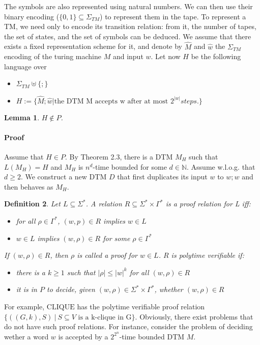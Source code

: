 \documentclass{report}
\newtheorem{definition}{Definition}[chapter]
\newtheorem{lemma}[definition]{Lemma}
\begin{document}
The symbols are also represented using natural numbers. We can then use their binary encoding ($\{0,1\}\subseteq\Sigma_{TM}$) to represent them in the tape. To represent a TM, we need only to encode its transition relation: from it, the number of tapes, the set of states, and the set of symbols can be deduced. We assume that there exists a fixed representation scheme for it, and denote by $\hat{M}$ and $\hat{w}$ the $\Sigma_{TM}$ encoding of the turing machine $M$ and input $w$. Let now $H$ be the following language over
\begin{itemize}
\item[] $\Sigma_{TM} \uplus \{;\}$
\item[] $H := \{ \hat{M};\hat{w} | \text{the DTM M accepts w after at most }2^{|w|} steps.\}$
\end{itemize}

\begin{lemma}
$H \not\in P$.
\end{lemma}

\paragraph{Proof} Assume that  $H \in P$. By Theorem 2.3, there is a DTM $M_H$ such that $L(M_H)=H$ and $M_H$ is $n^d$-time bounded for some $d \in \mathbb{N}$. Assume w.l.o.g. that $d \geq 2$. We construct a new DTM $D$ that first duplicates its input $w$ to $w;w$ and then behaves as $M_H$.

\begin{definition}
Let $L\subseteq\Sigma^*$. A relation $R\subseteq\Sigma^* \times \Gamma^*$ is a proof relation for L iff:
\begin{itemize}
\item[soundness] for all $\rho\in\Gamma^*$, $(w,p)\in R$ implies $w\in L$
\item[soundness] $w \in L$ implies $(w,\rho)\in R$ for some $\rho\in\Gamma^*$
\end{itemize}
If $(w,\rho)\in R$, then $\rho$ is called a proof for $w\in L$. $R$ is polytime verifiable if:
\begin{itemize}
\item[i] there is a $k\geq1$ such that $|\rho| \leq |w|^k$ for all $(w,\rho)\in R$
\item[ii] it is in $P$ to decide, given $(w,\rho)\in \Sigma^*\times\Gamma^*$, whether $(w,\rho)\in R$
\end{itemize}
\end{definition}
For example, $\mathrm{CLIQUE}$ has the polytime verifiable proof relation $\{((G,k),S)\ |\ S\subseteq V \text{ is a k-clique in G}\}$. Obviously, there exist problems that do not have such proof relations. For instance, consider the problem of deciding wether a word $w$ is accepted by a $2^{2^n}$-time bounded DTM $M$.
\end{document}

